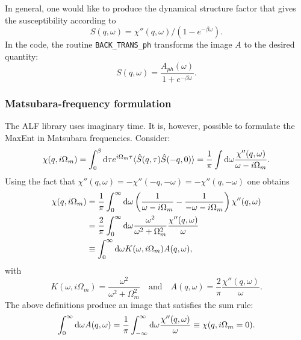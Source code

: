 In general,  one would like to produce the  dynamical structure factor that gives the susceptibility according to
\begin{equation}
 S(q,\omega)  = \chi''(q,\omega)/\left( 1 - e^{-\beta  \omega} \right). 
\end{equation}
In the code, the routine \texttt{BACK\_TRANS\_ph} transforms the image $A$ to the desired quantity:
\begin{equation}
	S(q,\omega) = \frac{A_{ph}(\omega)}{1 + e^{-\beta \omega} } .
\end{equation}
\subsubsection*{Matsubara-frequency formulation}
The ALF  library uses  imaginary time. It is, however, possible to formulate the MaxEnt in  Matsubara frequencies.
Consider:
\begin{equation}
  \chi(q,i\Omega_m) = \int_0^{\beta} \mathrm{d} \tau  e^{i \Omega_m \tau}
	\langle \hat{S}(q,\tau) \hat{S}(-q,0) \rangle  = \frac{1}{\pi}
   \int \mathrm{d} \omega  \frac{\chi''(q,\omega)}{ \omega - i \Omega_m }.
\end{equation}
Using the fact that $\chi''(q,\omega) = -\chi''(-q,-\omega) = -\chi''(q,-\omega)$ one obtains
\begin{align}
  \chi(q,i\Omega_m) &= 
	\frac{1}{\pi}
   \int_0^{\infty} \mathrm{d} \omega \left(\frac{1}{ \omega - i \Omega_m } - \frac{1}{ -\omega - i \Omega_m } \right)
         \chi''(q,\omega) \nonumber \\ 
    &= \frac{2}{\pi} \int_0^{\infty} \mathrm{d} \omega \frac{\omega^2}{ \omega^2  + \Omega_m^2 } 
  \frac{\chi''(q,\omega)}{\omega} \\
    &\equiv \int_0^{\infty} \mathrm{d} \omega K(\omega,i\Omega_m) A(q,\omega), \nonumber
\end{align}
with
\begin{equation}
   K(\omega,i\Omega_m) = \frac{\omega^2}{ \omega^2  + \Omega_m^2 } \quad \text{and} \quad
A(q,\omega) =  \frac{2}{\pi}   \frac{\chi''(q,\omega)}{\omega} .
\end{equation}
The above definitions produce an image that satisfies the sum rule:
\begin{equation}
\int_0^{\infty} \mathrm{d} \omega A(q,\omega) =  \frac{1}{\pi}  \int_{-\infty}^{\infty} \mathrm{d} \omega 
   \frac{\chi''(q,\omega)}{\omega}   \equiv \chi(q,i\Omega_m=0) .
\end{equation}

